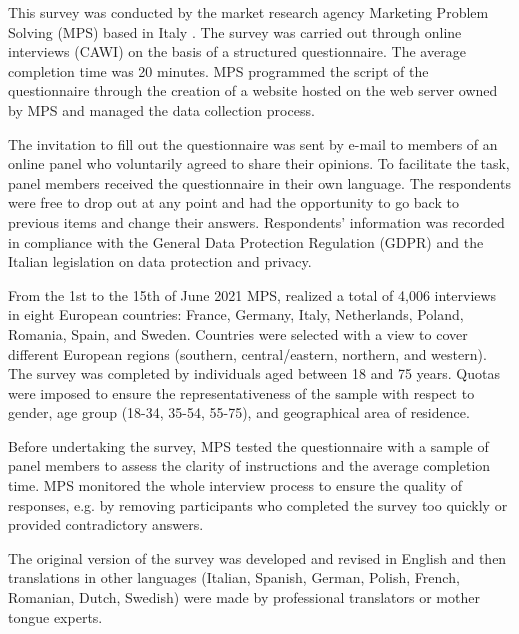 \documentclass{article}
\begin{document}
This survey was conducted by the market research agency Marketing Problem Solving (MPS) based in Italy \cite{Mpswebsite}. The survey was carried out through online interviews (CAWI) on the basis of a structured questionnaire. The average completion time was 20 minutes. MPS programmed the script of the questionnaire through the creation of a website hosted on the web server owned by MPS and managed the data collection process. 

The invitation to fill out the questionnaire was sent by e-mail to members of an online panel who voluntarily agreed to share their opinions. To facilitate the task, panel members received the questionnaire in their own language. The respondents were free to drop out at any point and had the opportunity to go back to previous items and change their answers. Respondents' information was recorded in compliance with the General Data Protection Regulation (GDPR) and the Italian legislation on data protection and privacy. 

From the 1st to the 15th of June 2021 MPS, realized a total of 4,006 interviews in eight European countries: France, Germany, Italy, Netherlands, Poland, Romania, Spain, and Sweden. Countries were selected with a view to cover different European regions (southern, central/eastern, northern, and western). The survey was completed by individuals aged between 18 and 75 years. Quotas were imposed to ensure the representativeness of the sample with respect to gender, age group (18-34, 35-54, 55-75), and geographical area of residence.

Before undertaking the survey, MPS tested the questionnaire with a sample of panel members to assess the clarity of instructions and the average completion time. MPS monitored the whole interview process to ensure the quality of responses, e.g. by removing participants who completed the survey too quickly or provided contradictory answers.

The original version of the survey was developed and revised in English and then translations in other languages (Italian, Spanish, German, Polish, French, Romanian, Dutch, Swedish) were made by professional translators or mother tongue experts.  
\end{document}
